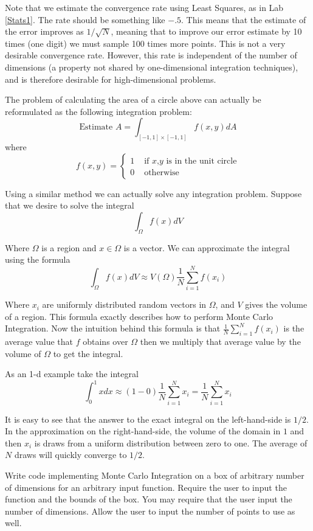 Note that we estimate the convergence rate using Least Squares, as in Lab \ref{Stats1}. 
The rate should be something like $-.5$. 
This means that the estimate of the error improves as $1/\sqrt{N}$, meaning that to improve our error estimate by 10 times (one digit) we must sample 100 times more points. 
This is not a very desirable convergence rate. 
However, this rate is independent of the number of dimensions (a property not shared by one-dimensional integration techniques), and is therefore desirable for high-dimensional problems.

The problem of calculating the area of a circle above can actually be reformulated as the following integration problem:
\[
\mbox{Estimate }A = \int_{[-1,1]\times[-1,1]} f(x,y) dA
\]
where
\[
f(x,y) = \begin{cases} 1 &\mbox{ if $x$,$y$ is in the unit circle} \\ 0 &\mbox{ otherwise} \end{cases}
\]

Using a similar method we can actually solve any integration problem. 
Suppose that we desire to solve the integral
\[
\int_\Omega f(x) dV
\]

Where $\Omega$ is a region and $x \in \Omega$ is a vector. 
We can approximate the integral using the formula
\[
\int_\Omega f(x) dV \approx V(\Omega) \frac{1}{N} \sum_{i=1}^N f(x_i)
\]

Where $x_i$ are uniformly distributed random vectors in $\Omega$, and $V$ gives the volume of a region. 
This formula exactly describes how to perform Monte Carlo Integration. 
Now the intuition behind this formula is that $\frac{1}{N} \sum_{i=1}^N f(x_i)$ is the average value that $f$ obtains over $\Omega$ then we multiply that average value by the volume of $\Omega$ to get the integral.

As an 1-d example take the integral 
\[
\int_0^1 x dx \approx (1-0)\frac{1}{N} \sum_{i=1}^N x_i=\frac{1}{N} \sum_{i=1}^N x_i
\]

It is easy to see that the answer to the exact integral on the left-hand-side is $1/2$. 
In the approximation on the right-hand-side, the volume of the domain in $1$ and then $x_i$ is draws from a uniform distribution between zero to one. 
The average of $N$ draws will quickly converge to $1/2$. 

\begin{problem}
\label{prob:mc}
Write code implementing Monte Carlo Integration on a box of arbitrary number of dimensions for an arbitrary input function. 
Require the user to input the function and the bounds of the box. 
You may require that the user input the number of dimensions. 
Allow the user to input the number of points to use as well.
\end{problem}

